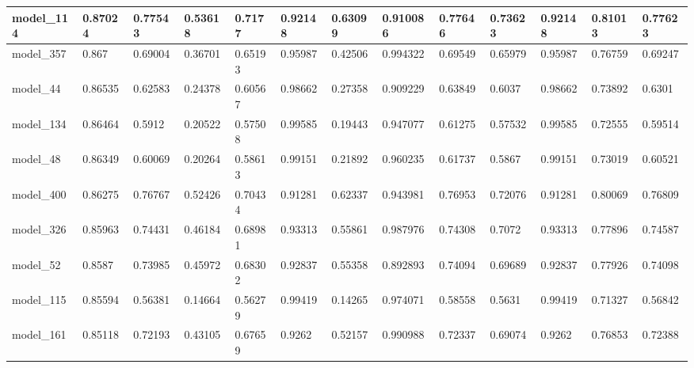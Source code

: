 \begin{tabular}{|l|l|l|l|l|l|l|l|l|l|l|l|l|}
model\_114     & 0.87024     & 0.77543        & 0.53618      & 0.7177           & 0.92148              & 0.63099              & 0.910086     & 0.77646           & 0.73623            & 0.92148         & 0.81013     & 0.77623      \\ \hline
model\_357     & 0.867       & 0.69004        & 0.36701      & 0.65193          & 0.95987              & 0.42506              & 0.994322     & 0.69549           & 0.65979            & 0.95987         & 0.76759     & 0.69247      \\ \hline
model\_44      & 0.86535     & 0.62583        & 0.24378      & 0.60567          & 0.98662              & 0.27358              & 0.909229     & 0.63849           & 0.6037             & 0.98662         & 0.73892     & 0.6301       \\ \hline
model\_134     & 0.86464     & 0.5912         & 0.20522      & 0.57508          & 0.99585              & 0.19443              & 0.947077     & 0.61275           & 0.57532            & 0.99585         & 0.72555     & 0.59514      \\ \hline
model\_48      & 0.86349     & 0.60069        & 0.20264      & 0.58613          & 0.99151              & 0.21892              & 0.960235     & 0.61737           & 0.5867             & 0.99151         & 0.73019     & 0.60521      \\ \hline
model\_400     & 0.86275     & 0.76767        & 0.52426      & 0.70434          & 0.91281              & 0.62337              & 0.943981     & 0.76953           & 0.72076            & 0.91281         & 0.80069     & 0.76809      \\ \hline
model\_326     & 0.85963     & 0.74431        & 0.46184      & 0.68981          & 0.93313              & 0.55861              & 0.987976     & 0.74308           & 0.7072             & 0.93313         & 0.77896     & 0.74587      \\ \hline
model\_52      & 0.8587      & 0.73985        & 0.45972      & 0.68302          & 0.92837              & 0.55358              & 0.892893     & 0.74094           & 0.69689            & 0.92837         & 0.77926     & 0.74098      \\ \hline
model\_115     & 0.85594     & 0.56381        & 0.14664      & 0.56279          & 0.99419              & 0.14265              & 0.974071     & 0.58558           & 0.5631             & 0.99419         & 0.71327     & 0.56842      \\ \hline
model\_161     & 0.85118     & 0.72193        & 0.43105      & 0.67659          & 0.9262               & 0.52157              & 0.990988     & 0.72337           & 0.69074            & 0.9262          & 0.76853     & 0.72388      \\ \hline

\end{tabular}
